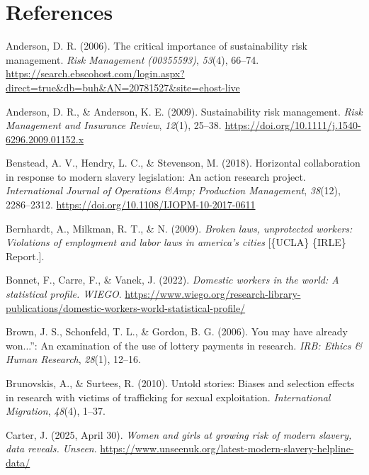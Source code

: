 \documentclass[
  12pt,
]{article}
\newlength{\cslhangindent}
\newenvironment{CSLReferences}[2] %
 {\begin{list}{}{%
  \setlength{\itemindent}{0pt}
  \setlength{\leftmargin}{0pt}
  \setlength{\parsep}{0pt}
  \ifodd #1
   \setlength{\leftmargin}{\cslhangindent}
   \setlength{\itemindent}{-1\cslhangindent}
  \fi
  \setlength{\itemsep}{#2\baselineskip}}}
 {\end{list}}
\theoremstyle{plain}
\theoremstyle{definition}
\begin{document}
\newpage

\section{References}\label{references}

\label{refs}
\begin{CSLReferences}{1}{0}
Anderson, D. R. (2006). The critical importance of sustainability risk
management. \emph{Risk Management (00355593)}, \emph{53}(4), 66--74.
\url{https://search.ebscohost.com/login.aspx?direct=true&db=buh&AN=20781527&site=ehost-live}

Anderson, D. R., \& Anderson, K. E. (2009). Sustainability risk
management. \emph{Risk Management and Insurance Review}, \emph{12}(1),
25--38. \url{https://doi.org/10.1111/j.1540-6296.2009.01152.x}

Benstead, A. V., Hendry, L. C., \& Stevenson, M. (2018). Horizontal
collaboration in response to modern slavery legislation: An action
research project. \emph{International Journal of Operations \&Amp;
Production Management}, \emph{38}(12), 2286--2312.
\url{https://doi.org/10.1108/IJOPM-10-2017-0611}

Bernhardt, A., Milkman, R. T., \& N. (2009). \emph{Broken laws,
unprotected workers: Violations of employment and labor laws in
america's cities} {[}\{UCLA\} \{IRLE\} Report.{]}.

Bonnet, F., Carre, F., \& Vanek, J. (2022). \emph{Domestic workers in
the world: A statistical profile. {WIEGO}}.
\url{https://www.wiego.org/research-library-publications/domestic-workers-world-statistical-profile/}

Brown, J. S., Schonfeld, T. L., \& Gordon, B. G. (2006). You may have
already won...'': An examination of the use of lottery payments in
research. \emph{{IRB}: Ethics \& Human Research}, \emph{28}(1), 12--16.

Brunovskis, A., \& Surtees, R. (2010). Untold stories: Biases and
selection effects in research with victims of trafficking for sexual
exploitation. \emph{International Migration}, \emph{48}(4), 1--37.

Carter, J. (2025, April 30). \emph{Women and girls at growing risk of
modern slavery, data reveals. Unseen}.
\url{https://www.unseenuk.org/latest-modern-slavery-helpline-data/}


\end{CSLReferences}
\end{document}
